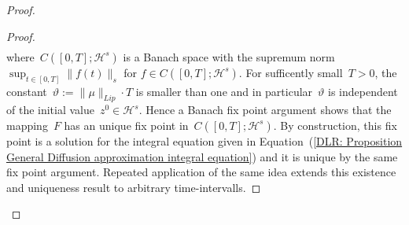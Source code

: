 \begin{proof}
\begin{proof}
\begin{align*}
    \end{align*}
    where~$C([0,T];\mathcal{H}^s)$ is a Banach space with the supremum norm~$\sup_{t \in [0,T]} \| f(t) \|_s $ for $f \in C([0,T];\mathcal{H}^s)$. For sufficently small~$T>0$, the constant~$\vartheta := \| \mu \|_{Lip} \cdot T$ is smaller than one and in particular~$\vartheta $ is independent of the initial value~$z^0 \in \mathcal{H}^s$. Hence a Banach fix point argument shows that the mapping~$F$ has an unique fix point in~$C([0,T];\mathcal{H}^s)$. By construction, this fix point is a solution for the integral equation given in Equation~(\ref{DLR: Proposition General Diffusion approximation integral equation}) and it is unique by the same fix point argument. Repeated application of the same idea extends this existence and uniqueness result to arbitrary time-intervalls. 
    

\end{proof}
\end{proof}
